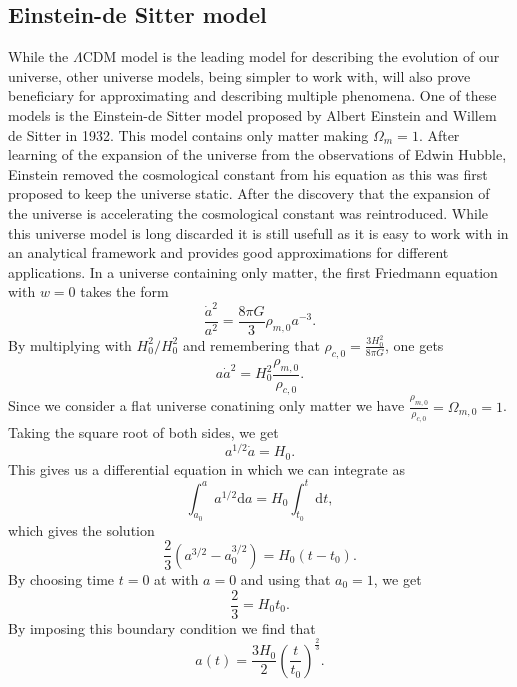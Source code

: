 \subsection{Einstein-de Sitter model}
While the $\Lambda$CDM model is the leading model for describing the evolution
of our universe, other universe models, being simpler to work with, will also
prove beneficiary for approximating and describing multiple phenomena. One of
these models is the Einstein-de Sitter model \cite{1932PNAS...18..213E} proposed
by Albert Einstein and Willem de Sitter in 1932. This model contains only matter
making $\Omega_m=1$. After learning of the expansion
of the universe from the observations of Edwin Hubble, Einstein removed the
cosmological constant from his equation as this was first proposed to keep the
universe static. After the discovery that the expansion of the universe is
accelerating \cite{Goldhaber_2009}\cite{Filippenko_1998} the cosmological
constant was reintroduced. While this universe model is long discarded it is
still usefull as it is easy to work with in an analytical framework and provides
good approximations for different applications. In a universe containing only
matter, the first Friedmann equation with $w=0$ takes the form
\begin{equation}
    \frac{\dot{a}^2}{a^2} = \frac{8\pi G}{3}\rho_{m,0}a^{-3}.
\end{equation}
By multiplying with $H_0^2/H_0^2$ and remembering that $\rho_{c,0}=\frac{3H_0^2}{8\pi
G}$, one gets
\begin{equation}
    a\dot{a}^2=H_0^2\frac{\rho_{m,0}}{\rho_{c,0}}.
\end{equation}
Since we consider a flat universe conatining only matter we have
$\frac{\rho_{m,0}}{\rho_{c,0}}=\Omega_{m,0}=1$. Taking the square root of both
sides, we get
\begin{equation}
    a^{1/2}\dot{a}=H_0.
\end{equation}
This gives us a differential equation in which we can integrate as
\begin{equation}
    \int_{a_0}^a a^{1/2}\mathrm{d}a=H_0\int_{t_0}^t \mathrm{d}t,
\end{equation}
which gives the solution
\begin{equation}
    \frac{2}{3}(a^{3/2}-a_0^{3/2})=H_0(t-t_0).
\end{equation}
By choosing time $t=0$ at with $a=0$ and using that $a_0=1$, we get
\begin{equation}
    \frac{2}{3}=H_0t_0.
\end{equation}
By imposing this boundary condition we find that
\begin{equation}
    a(t)=\frac{3H_0}{2}(\frac{t}{t_0})^\frac{2}{3}.
\end{equation}

